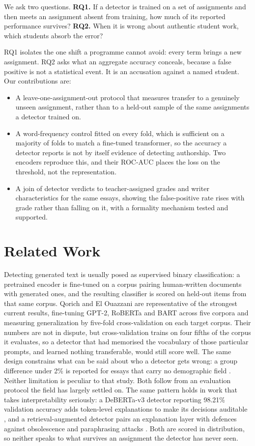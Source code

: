 \documentclass{article}
\begin{document}
We ask two questions. \textbf{RQ1.} If a detector is trained on a set of
assignments and then meets an assignment absent from training, how much of
its reported performance survives? \textbf{RQ2.} When it is wrong about
authentic student work, which students absorb the error?

RQ1 isolates the one shift a programme cannot avoid: every term brings a
new assignment. RQ2 asks what an aggregate accuracy conceals, because a
false positive is not a statistical event. It is an accusation against a
named student. Our contributions are:

\begin{itemize}\itemsep2pt
\item A leave-one-assignment-out protocol that measures transfer to a
genuinely unseen assignment, rather than to a held-out sample of the same
assignments a detector trained on.
\item A word-frequency control fitted on every fold, which is sufficient on
a majority of folds to match a fine-tuned transformer, so the accuracy a
detector reports is not by itself evidence of detecting authorship. Two
encoders reproduce this, and their ROC-AUC places the loss on the
threshold, not the representation.
\item A join of detector verdicts to teacher-assigned grades and writer
characteristics for the same essays, showing the false-positive rate rises
with grade rather than falling on it, with a formality mechanism tested and
supported.
\end{itemize}

\section{Related Work}

Detecting generated text is usually posed as supervised binary
classification: a pretrained encoder is fine-tuned on a corpus pairing
human-written documents with generated ones, and the resulting classifier
is scored on held-out items from that same corpus. Qorich and El Ouazzani
are representative of the strongest current results, fine-tuning GPT-2,
RoBERTa and BART across five corpora \cite{qorich2025} and measuring
generalization by five-fold cross-validation on each target corpus. Their
numbers are not in dispute, but cross-validation trains on four fifths of
the corpus it evaluates, so a detector that had memorised the vocabulary of
those particular prompts, and learned nothing transferable, would still
score well. The same design constrains what can be said about who a
detector gets wrong: a group difference under 2\% is reported for essays
that carry no demographic field \cite{qorich2025}. Neither limitation is
peculiar to that study. Both follow from an evaluation protocol the field
has largely settled on. The same pattern holds in work that takes
interpretability seriously: a DeBERTa-v3 detector reporting 98.21\%
validation accuracy adds token-level explanations to make its decisions
auditable \cite{sentinel2026}, and a retrieval-augmented detector pairs an
explanation layer with defences against obsolescence and paraphrasing
attacks \cite{rag2026}. Both are scored in distribution, so neither speaks
to what survives an assignment the detector has never seen.
\end{document}
